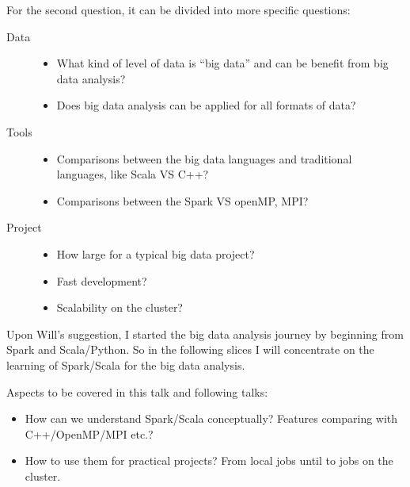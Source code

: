 \documentclass[notheorems, aspectratio=54]{beamer}
\begin{document}
\begin{frame}

For the second question, it can be divided into more specific questions:

\begin{description}
 \item [Data]
 \begin{itemize}
  \item What kind of level of data is ``big data'' and can be benefit from big data analysis?
  \item Does big data analysis can be applied for all formats of data?
 \end{itemize}
  \item [Tools]
 \begin{itemize}
  \item Comparisons between the big data languages and traditional languages, like Scala VS C++?
  \item Comparisons between the Spark VS openMP, MPI?  
 \end{itemize}
  \item [Project]
 \begin{itemize}
  \item How large for a typical big data project?
  \item Fast development?
  \item Scalability on the cluster?
 \end{itemize}
\end{description} 

\end{frame}


\begin{frame}

Upon Will's suggestion, I started the big data analysis journey by beginning from Spark and Scala/Python.
So in the following slices I will concentrate on the learning of Spark/Scala for the big data analysis.

Aspects to be covered in this talk and following talks: 
\begin{itemize}
 \item How can we understand Spark/Scala conceptually? Features comparing with C++/OpenMP/MPI etc.?
 \item How to use them for practical projects? From local jobs until to jobs on the cluster.
\end{itemize}


\end{frame}
\end{document}
